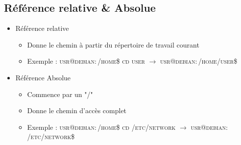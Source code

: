 \documentclass[a4paper]{article}
\begin{document}
    \subsection{Référence relative \& Absolue}
    \begin{itemize}[label=\textbullet, font=\Large]
      \item Référence relative
      \begin{itemize}[label=, font=\scriptsize]
        \item Donne le chemin à partir du répertoire de travail courant
        \item Exemple : \textsc{usr@debian$:$/home\$ \space cd user} $\rightarrow$ \textsc{usr@debian$:$/home/user\$}
      \end{itemize}
      \item Référence Absolue
      \begin{itemize}[label=, font=\scriptsize]
        \item Commence par un "/"
        \item Donne le chemin d'accès complet
        \item Exemple : \textsc{usr@debian$:$/home\$ \space cd /etc/network} $\rightarrow$ \textsc{usr@debian$:$/etc/network\$}
      \end{itemize}
    \end{itemize}
\end{document}
